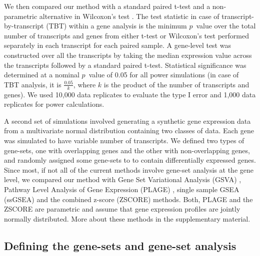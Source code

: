 \documentclass[hidelinks,11pt]{article}
\begin{document}
We then compared our method with a standard paired t-test and a non-parametric alternative in Wilcoxon's test \cite{wilcoxon}. The test statistic in case of transcript-by-transcript (TBT) within a gene analysis is the minimum $p$~value over the total number of transcripts and genes from either t-test or Wilcoxon's test performed separately in each transcript for each paired sample. A gene-level test was constructed over all the transcripts by taking the median expression value across the transcripts followed by a standard paired t-test. Statistical significance was determined at a nominal $p$~value of 0.05 for all power simulations (in case of TBT analysis, it is $\frac{0.05}{k}$,  where $k$ is the product of the number of transcripts and genes). We used 10,000 data replicates to evaluate the type I error and 1,000 data replicates for power calculations. 

A second set of simulations involved generating a synthetic gene expression data from a multivariate normal distribution containing two classes of data. Each gene was simulated to have variable number of transcripts. We defined two types of gene-sets, one with overlapping genes and the other with non-overlapping genes, and randomly assigned some gene-sets to to contain differentially expressed genes. Since most, if not all of the current methods involve gene-set analysis at the gene level, we compared our method with Gene Set Variational Analysis (GSVA) \cite{gsva}, Pathway Level Analysis of Gene Expression (PLAGE) \cite{plage}, single sample GSEA (ssGSEA) \cite{ssgsea} and the combined z-score (ZSCORE) \cite{zscore} methods. Both, PLAGE and the ZSCORE are parametric and assume that gene expression profiles are jointly normally distributed. More about these methods in the supplementary material. 

\subsection*{Defining the gene-sets and gene-set analysis}
\end{document}
